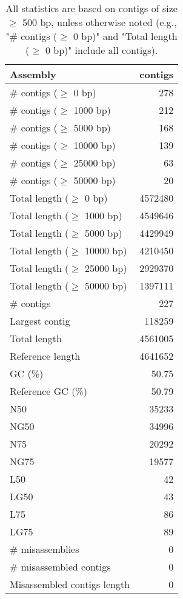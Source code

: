 \documentclass[12pt,a4paper]{article}
\begin{document}
\begin{table}[ht]
\begin{center}
\caption{All statistics are based on contigs of size $\geq$ 500 bp, unless otherwise noted (e.g., "\# contigs ($\geq$ 0 bp)" and "Total length ($\geq$ 0 bp)" include all contigs).}
\begin{tabular}{|l*{1}{|r}|}
\hline
Assembly & contigs \\ \hline
\# contigs ($\geq$ 0 bp) & 278 \\ \hline
\# contigs ($\geq$ 1000 bp) & 212 \\ \hline
\# contigs ($\geq$ 5000 bp) & 168 \\ \hline
\# contigs ($\geq$ 10000 bp) & 139 \\ \hline
\# contigs ($\geq$ 25000 bp) & 63 \\ \hline
\# contigs ($\geq$ 50000 bp) & 20 \\ \hline
Total length ($\geq$ 0 bp) & 4572480 \\ \hline
Total length ($\geq$ 1000 bp) & 4549646 \\ \hline
Total length ($\geq$ 5000 bp) & 4429949 \\ \hline
Total length ($\geq$ 10000 bp) & 4210450 \\ \hline
Total length ($\geq$ 25000 bp) & 2929370 \\ \hline
Total length ($\geq$ 50000 bp) & 1397111 \\ \hline
\# contigs & 227 \\ \hline
Largest contig & 118259 \\ \hline
Total length & 4561005 \\ \hline
Reference length & 4641652 \\ \hline
GC (\%) & 50.75 \\ \hline
Reference GC (\%) & 50.79 \\ \hline
N50 & 35233 \\ \hline
NG50 & 34996 \\ \hline
N75 & 20292 \\ \hline
NG75 & 19577 \\ \hline
L50 & 42 \\ \hline
LG50 & 43 \\ \hline
L75 & 86 \\ \hline
LG75 & 89 \\ \hline
\# misassemblies & 0 \\ \hline
\# misassembled contigs & 0 \\ \hline
Misassembled contigs length & 0 \\ \hline

\end{tabular}
\end{center}
\end{table}
\end{document}
